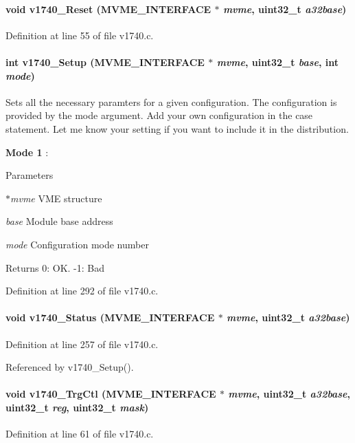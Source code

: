 \paragraph[{v1740\_\-Reset}]{\setlength{\rightskip}{0pt plus 5cm}void v1740\_\-Reset ({\bf MVME\_\-INTERFACE} $\ast$ {\em mvme}, \/  uint32\_\-t {\em a32base})}\hfill\label{v1740drv_8h_a8f33b34d42f09d14dd4e6b3c2a7a33cb}


Definition at line 55 of file v1740.c.
\paragraph[{v1740\_\-Setup}]{\setlength{\rightskip}{0pt plus 5cm}int v1740\_\-Setup ({\bf MVME\_\-INTERFACE} $\ast$ {\em mvme}, \/  uint32\_\-t {\em base}, \/  int {\em mode})}\hfill\label{v1740drv_8h_a023699754aec7c0d004358fffe10d4c2}
Sets all the necessary paramters for a given configuration. The configuration is provided by the mode argument. Add your own configuration in the case statement. Let me know your setting if you want to include it in the distribution.
\begin{DoxyItemize}
\item {\bfseries Mode 1} :
\end{DoxyItemize}


\begin{DoxyParams}{Parameters}
\item[{\em $\ast$mvme}]VME structure \item[{\em base}]Module base address \item[{\em mode}]Configuration mode number \end{DoxyParams}
\begin{DoxyReturn}{Returns}
0: OK. -\/1: Bad 
\end{DoxyReturn}


Definition at line 292 of file v1740.c.
\paragraph[{v1740\_\-Status}]{\setlength{\rightskip}{0pt plus 5cm}void v1740\_\-Status ({\bf MVME\_\-INTERFACE} $\ast$ {\em mvme}, \/  uint32\_\-t {\em a32base})}\hfill\label{v1740drv_8h_aa425ee4506bc04eab05967b376c8189f}


Definition at line 257 of file v1740.c.

Referenced by v1740\_\-Setup().
\paragraph[{v1740\_\-TrgCtl}]{\setlength{\rightskip}{0pt plus 5cm}void v1740\_\-TrgCtl ({\bf MVME\_\-INTERFACE} $\ast$ {\em mvme}, \/  uint32\_\-t {\em a32base}, \/  uint32\_\-t {\em reg}, \/  uint32\_\-t {\em mask})}\hfill\label{v1740drv_8h_af0f4f58da598a724e573272ba44f6fad}


Definition at line 61 of file v1740.c.